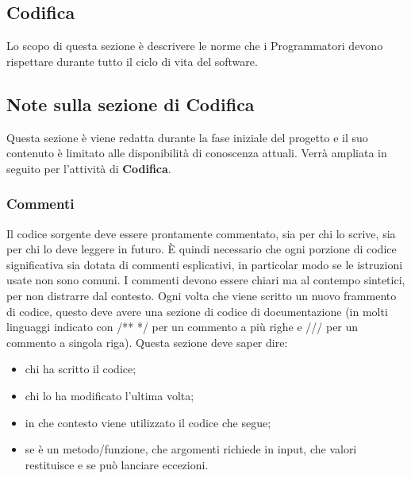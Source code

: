 \subsection{Codifica}
Lo scopo di questa sezione è descrivere le norme che i Programmatori devono rispettare durante tutto il ciclo di vita del software.

\subsection{Note sulla sezione di Codifica}
Questa sezione è viene redatta durante la fase iniziale del progetto e il suo contenuto è limitato alle disponibilità di conoscenza attuali.
Verrà ampliata in seguito per l'attività di \textbf{Codifica}.

\subsubsection{Commenti}
Il codice sorgente deve essere prontamente commentato, sia per chi lo scrive, sia per chi lo deve leggere in futuro.
È quindi necessario che ogni porzione di codice significativa sia dotata di commenti esplicativi, in particolar modo se le istruzioni usate non sono comuni.
I commenti devono essere chiari ma al contempo sintetici, per non distrarre dal contesto.
Ogni volta che viene scritto un nuovo frammento di codice, questo deve avere una sezione di codice di documentazione (in molti linguaggi indicato con /** */ per un commento a più righe e /// per un commento a singola riga).
Questa sezione deve saper dire:
\begin{itemize}
    \item chi ha scritto il codice;
    \item chi lo ha modificato l'ultima volta;
    \item in che contesto viene utilizzato il codice che segue;
    \item se è un metodo/funzione, che argomenti richiede in input, che valori restituisce e se può lanciare eccezioni.
\end{itemize}

